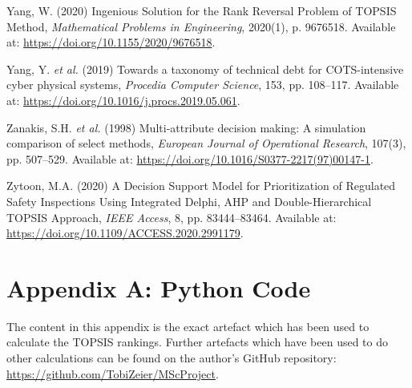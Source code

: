 \documentclass[
  12pt,
  letterpaper,
  12pt,
  oneside,
  english,
  onehalfspacing,
  headsepline]{MastersDoctoralThesis}
\newlength{\cslhangindent}
\newenvironment{CSLReferences}[2] %
 {\begin{list}{}{%
  \setlength{\itemindent}{0pt}
  \setlength{\leftmargin}{0pt}
  \setlength{\parsep}{0pt}
  \ifodd #1
   \setlength{\leftmargin}{\cslhangindent}
   \setlength{\itemindent}{-1\cslhangindent}
  \fi
  \setlength{\itemsep}{#2\baselineskip}}}
 {\end{list}}
\begin{document}
\begin{CSLReferences}{0}{1}
Yang, W. (2020) \textquotesingle Ingenious {Solution} for the {Rank
Reversal Problem} of {TOPSIS Method}\textquotesingle, \emph{Mathematical
Problems in Engineering}, 2020(1), p. 9676518. Available at:
\url{https://doi.org/10.1155/2020/9676518}.

Yang, Y. \emph{et al.} (2019) \textquotesingle Towards a taxonomy of
technical debt for {COTS-intensive} cyber physical
systems\textquotesingle, \emph{Procedia Computer Science}, 153, pp.
108--117. Available at:
\url{https://doi.org/10.1016/j.procs.2019.05.061}.

Zanakis, S.H. \emph{et al.} (1998) \textquotesingle Multi-attribute
decision making: {A} simulation comparison of select
methods\textquotesingle, \emph{European Journal of Operational
Research}, 107(3), pp. 507--529. Available at:
\url{https://doi.org/10.1016/S0377-2217(97)00147-1}.

Zytoon, M.A. (2020) \textquotesingle A {Decision Support Model} for
{Prioritization} of {Regulated Safety Inspections Using Integrated
Delphi}, {AHP} and {Double-Hierarchical TOPSIS
Approach}\textquotesingle, \emph{IEEE Access}, 8, pp. 83444--83464.
Available at: \url{https://doi.org/10.1109/ACCESS.2020.2991179}.

\end{CSLReferences}

\cleardoublepage
{}
{}
\appendix

\chapter{Appendix A: Python Code}\label{sec-appendixa}

The content in this appendix is the exact artefact which has been used
to calculate the TOPSIS rankings. Further artefacts which have been used
to do other calculations can be found on the author's GitHub repository:
\url{https://github.com/TobiZeier/MScProject}.
\end{document}
